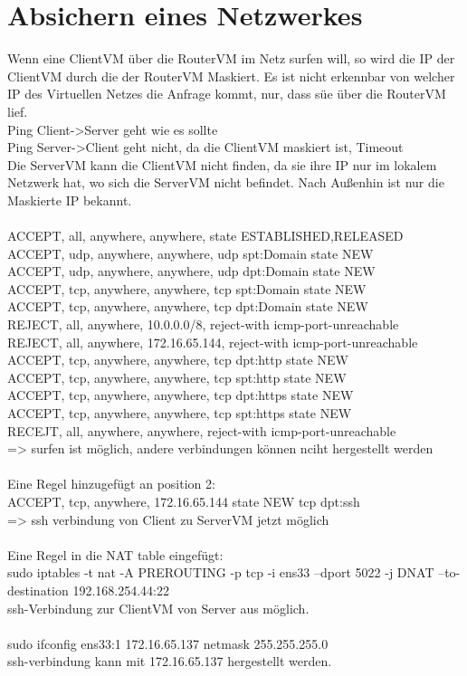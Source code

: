 \documentclass[12pt]{article}
\theoremstyle{plain}
\begin{document}
\section{Absichern eines Netzwerkes}
Wenn eine ClientVM über die RouterVM im Netz surfen will, so wird die IP der ClientVM durch die der RouterVM Maskiert. Es ist nicht erkennbar von welcher IP des Virtuellen Netzes die Anfrage kommt, nur, dass süe über die RouterVM lief.\\
Ping Client->Server geht wie es sollte\\
Ping Server->Client geht nicht, da die ClientVM maskiert ist, Timeout\\
Die ServerVM kann die ClientVM nicht finden, da sie ihre IP nur im lokalem Netzwerk hat, wo sich die ServerVM nicht befindet. Nach Außenhin ist nur die Maskierte IP bekannt.\\
\\
ACCEPT, all, anywhere, anywhere, state ESTABLISHED,RELEASED
ACCEPT, udp, anywhere, anywhere, udp spt:Domain state NEW\\
ACCEPT, udp, anywhere, anywhere, udp dpt:Domain state NEW\\
ACCEPT, tcp, anywhere, anywhere, tcp spt:Domain state NEW\\
ACCEPT, tcp, anywhere, anywhere, tcp dpt:Domain state NEW\\
REJECT, all, anywhere, 10.0.0.0/8, reject-with icmp-port-unreachable\\
REJECT, all, anywhere, 172.16.65.144, reject-with icmp-port-unreachable\\
ACCEPT, tcp, anywhere, anywhere, tcp dpt:http state NEW\\
ACCEPT, tcp, anywhere, anywhere, tcp spt:http state NEW\\
ACCEPT, tcp, anywhere, anywhere, tcp dpt:https state NEW\\
ACCEPT, tcp, anywhere, anywhere, tcp spt:https state NEW\\
RECEJT, all, anywhere, anywhere, reject-with icmp-port-unreachable\\
=> surfen ist möglich, andere verbindungen können nciht hergestellt werden\\
\\
Eine Regel hinzugefügt an position 2:\\
ACCEPT, tcp, anywhere, 172.16.65.144 state NEW tcp dpt:ssh\\
=> ssh verbindung von Client zu ServerVM jetzt möglich\\
\\
Eine Regel in die NAT table eingefügt:\\
sudo iptables -t nat -A PREROUTING -p tcp -i ens33 --dport 5022 -j DNAT --to-destination 192.168.254.44:22\\
ssh-Verbindung zur ClientVM von Server aus möglich.\\
\\
sudo ifconfig ens33:1 172.16.65.137 netmask 255.255.255.0\\
ssh-verbindung kann mit 172.16.65.137 hergestellt werden.\\
\end{document}
